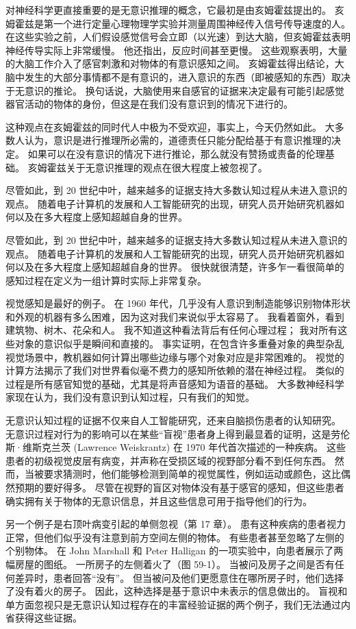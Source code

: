 对神经科学更直接重要的是无意识推理的概念，它最初是由亥姆霍兹提出的。 亥姆霍兹是第一个进行定量心理物理学实验并测量周围神经传入信号传导速度的人。 在这些实验之前，人们假设感觉信号会立即（以光速）到达大脑，但亥姆霍兹表明神经传导实际上非常缓慢。 他还指出，反应时间甚至更慢。 这些观察表明，大量的大脑工作介入了感官刺激和对物体的有意识感知之间。 亥姆霍兹得出结论，大脑中发生的大部分事情都不是有意识的，进入意识的东西（即被感知的东西）取决于无意识的推论。 换句话说，大脑使用来自感官的证据来决定最有可能引起感觉器官活动的物体的身份，但这是在我们没有意识到的情况下进行的。

这种观点在亥姆霍兹的同时代人中极为不受欢迎，事实上，今天仍然如此。 大多数人认为，意识是进行推理所必需的，道德责任只能分配给基于有意识推理的决定。 如果可以在没有意识的情况下进行推论，那么就没有赞扬或责备的伦理基础。 亥姆霍兹关于无意识推理的观点在很大程度上被忽视了。

尽管如此，到 20 世纪中叶，越来越多的证据支持大多数认知过程从未进入意识的观点。 随着电子计算机的发展和人工智能研究的出现，研究人员开始研究机器如何以及在多大程度上感知超越自身的世界。

尽管如此，到 20 世纪中叶，越来越多的证据支持大多数认知过程从未进入意识的观点。 随着电子计算机的发展和人工智能研究的出现，研究人员开始研究机器如何以及在多大程度上感知超越自身的世界。 很快就很清楚，许多乍一看很简单的感知过程在定义为一组计算时实际上非常复杂。

视觉感知是最好的例子。 在 1960 年代，几乎没有人意识到制造能够识别物体形状和外观的机器有多么困难，因为这对我们来说似乎太容易了。 我看着窗外，看到建筑物、树木、花朵和人。 我不知道这种看法背后有任何心理过程； 我对所有这些对象的意识似乎是瞬间和直接的。 事实证明，在包含许多重叠对象的典型杂乱视觉场景中，教机器如何计算出哪些边缘与哪个对象对应是非常困难的。 视觉的计算方法揭示了我们对世界看似毫不费力的感知所依赖的潜在神经过程。 类似的过程是所有感官知觉的基础，尤其是将声音感知为语音的基础。 大多数神经科学家现在认为，我们没有意识到认知过程，只有我们的知觉。

无意识认知过程的证据不仅来自人工智能研究，还来自脑损伤患者的认知研究。 无意识过程对行为的影响可以在某些“盲视”患者身上得到最显着的证明，这是劳伦斯·维斯克兰茨 (Lawrence Weiskrantz) 在 1970 年代首次描述的一种疾病。 这些患者的初级视觉皮层有病变，并声称在受损区域的视野部分看不到任何东西。 然而，当被要求猜测时，他们能够检测到简单的视觉属性，例如运动或颜色，这比偶然预期的要好得多。 尽管在视野的盲区对物体没有基于感官的感知，但这些患者确实拥有关于物体的无意识信息，并且这些信息可用于指导他们的行为。

另一个例子是右顶叶病变引起的单侧忽视（第 17 章）。 患有这种疾病的患者视力正常，但他们似乎没有注意到前方空间左侧的物体。 有些患者甚至忽略了左侧的个别物体。 在 John Marshall 和 Peter Halligan 的一项实验中，向患者展示了两幅房屋的图纸。 一所房子的左侧着火了（图 59-1）。 当被问及房子之间是否有任何差异时，患者回答“没有”。 但当被问及他们更愿意住在哪所房子时，他们选择了没有着火的房子。 因此，这种选择是基于意识中未表示的信息做出的。 盲视和单方面忽视只是无意识认知过程存在的丰富经验证据的两个例子，我们无法通过内省获得这些证据。

